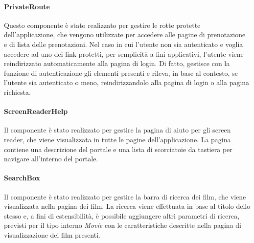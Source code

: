 \paragraph{PrivateRoute}

Questo componente è stato realizzato per gestire le rotte protette dell'applicazione, che vengono utilizzate per accedere alle pagine di prenotazione e di lista delle prenotazioni.
Nel caso in cui l'utente non sia autenticato e voglia accedere ad uno dei link protetti, per semplicità a fini applicativi,
l'utente viene reindirizzato automaticamente alla pagina di login. Di fatto, gestisce con la funzione di autenticazione gli elementi presenti e rileva,
in base al contesto, se l'utente sia autenticato o meno, reindirizzandolo alla pagina di login o alla pagina richiesta.

\paragraph{ScreenReaderHelp}

Il componente è stato realizzato per gestire la pagina di aiuto per gli screen reader, che viene visualizzata in tutte le pagine dell'applicazione.
La pagina contiene una descrizione del portale e una lista di scorciatoie da tastiera per navigare all'interno del portale.

\paragraph{SearchBox}

Il componente è stato realizzato per gestire la barra di ricerca dei film, che viene visualizzata nella pagina dei film.
La ricerca viene effettuata in base al titolo dello stesso e, a fini di estensibilità, è possibile aggiungere altri parametri di ricerca, previsti per il tipo interno \textit{Movie}
con le caratteristiche descritte nella pagina di visualizzazione dei film presenti.